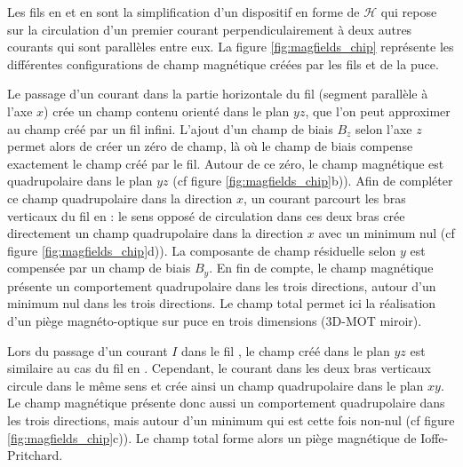 Les fils en  et en  sont la simplification d'un dispositif en forme de $\mathcal{H}$ qui repose sur la circulation d'un premier courant perpendiculairement à deux autres courants qui sont parallèles entre eux.
La figure \eqref{fig:magfields_chip} représente les différentes configurations de champ magnétique créées par les fils  et  de la puce.

Le passage d'un courant dans la partie horizontale du fil (segment parallèle à l'axe $x$) crée un champ contenu orienté dans le plan $yz$, que l'on peut approximer au champ créé par un fil infini.
L'ajout d'un champ de biais $B_z$ selon l'axe $z$ permet alors de créer un zéro de champ, là où le champ de biais compense exactement le champ créé par le fil.
Autour de ce zéro, le champ magnétique est quadrupolaire dans le plan $yz$ (cf figure \ref{fig:magfields_chip}b)).
Afin de compléter ce champ quadrupolaire dans la direction $x$, un courant parcourt les bras verticaux du fil en  : le sens opposé de circulation dans ces deux bras crée directement un champ quadrupolaire dans la direction $x$ avec un minimum nul (cf figure \ref{fig:magfields_chip}d)).
La composante de champ résiduelle selon $y$ est compensée par un champ de biais $B_y$.
En fin de compte, le champ magnétique présente un comportement quadrupolaire dans les trois directions, autour d'un minimum nul dans les trois directions.
Le champ total permet ici la réalisation d'un piège magnéto-optique sur puce en trois dimensions (\og 3D-MOT miroir\fg{}).

Lors du passage d'un courant $I$ dans le fil , le champ créé dans le plan $yz$ est similaire au cas du fil en .
Cependant, le courant dans les deux bras verticaux circule dans le même sens et crée ainsi un champ quadrupolaire dans le plan $xy$.
Le champ magnétique présente donc aussi un comportement quadrupolaire dans les trois directions, mais autour d'un minimum qui est cette fois non-nul (cf figure \ref{fig:magfields_chip}c)).
Le champ total forme alors un piège magnétique de Ioffe-Pritchard.

